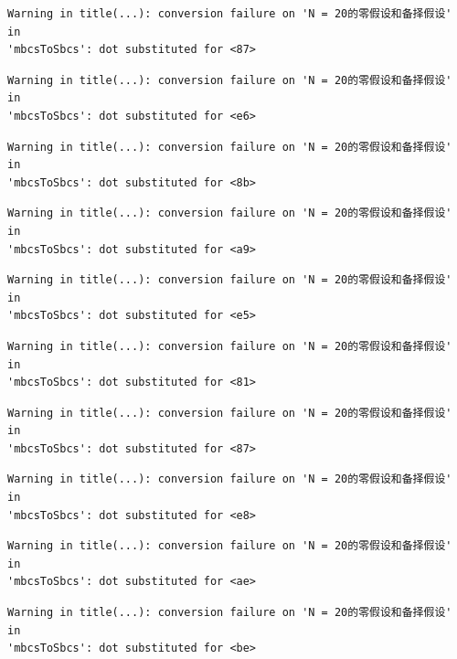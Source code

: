 \documentclass[
  letterpaper,
  DIV=11,
  numbers=noendperiod]{scrreprt}
\begin{document}
\begin{verbatim}
Warning in title(...): conversion failure on 'N = 20的零假设和备择假设' in
'mbcsToSbcs': dot substituted for <87>
\end{verbatim}

\begin{verbatim}
Warning in title(...): conversion failure on 'N = 20的零假设和备择假设' in
'mbcsToSbcs': dot substituted for <e6>
\end{verbatim}

\begin{verbatim}
Warning in title(...): conversion failure on 'N = 20的零假设和备择假设' in
'mbcsToSbcs': dot substituted for <8b>
\end{verbatim}

\begin{verbatim}
Warning in title(...): conversion failure on 'N = 20的零假设和备择假设' in
'mbcsToSbcs': dot substituted for <a9>
\end{verbatim}

\begin{verbatim}
Warning in title(...): conversion failure on 'N = 20的零假设和备择假设' in
'mbcsToSbcs': dot substituted for <e5>
\end{verbatim}

\begin{verbatim}
Warning in title(...): conversion failure on 'N = 20的零假设和备择假设' in
'mbcsToSbcs': dot substituted for <81>
\end{verbatim}

\begin{verbatim}
Warning in title(...): conversion failure on 'N = 20的零假设和备择假设' in
'mbcsToSbcs': dot substituted for <87>
\end{verbatim}

\begin{verbatim}
Warning in title(...): conversion failure on 'N = 20的零假设和备择假设' in
'mbcsToSbcs': dot substituted for <e8>
\end{verbatim}

\begin{verbatim}
Warning in title(...): conversion failure on 'N = 20的零假设和备择假设' in
'mbcsToSbcs': dot substituted for <ae>
\end{verbatim}

\begin{verbatim}
Warning in title(...): conversion failure on 'N = 20的零假设和备择假设' in
'mbcsToSbcs': dot substituted for <be>
\end{verbatim}
\end{document}
